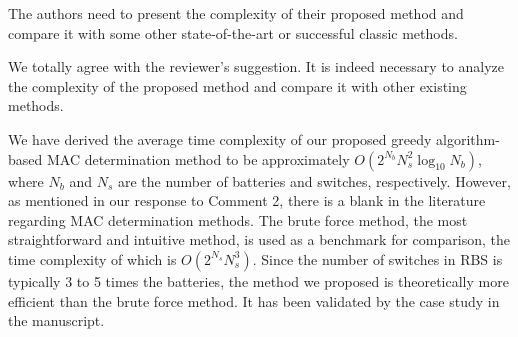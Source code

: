 \begin{revcomment}
  The authors need to present the complexity of their proposed method and compare it with some other state-of-the-art or successful classic methods.
\end{revcomment}
\begin{revresponse}

We totally agree with the reviewer's suggestion.
It is indeed necessary to analyze the complexity of the proposed method and compare it with other existing methods.


We have derived the average time complexity of our proposed greedy algorithm-based MAC determination method to be approximately $O(2^{N_b}N_s^2\log_{10} N_b)$, where $N_b$ and $N_s$ are the number of batteries and switches, respectively.
However, as mentioned in our response to Comment 2, there is a blank in the literature regarding MAC determination methods.
The brute force method, the most straightforward and intuitive method, is used as a benchmark for comparison, the time complexity of which is $O(2^{N_s}N_s^3)$.
Since the number of switches in RBS is typically 3 to 5 times the batteries\cite{ciNovelDesignAdaptive2007,alahmadBatterySwitchArray2008,kimDependableEfficientScalable2010b,kimBalancedReconfigurationStorage2011a,taesickimSeriesconnectedSelfreconfigurableMulticell2012a,6843711}, the method we proposed is theoretically more efficient than the brute force method.
It has been validated by the case study in the manuscript.



\end{revresponse}
